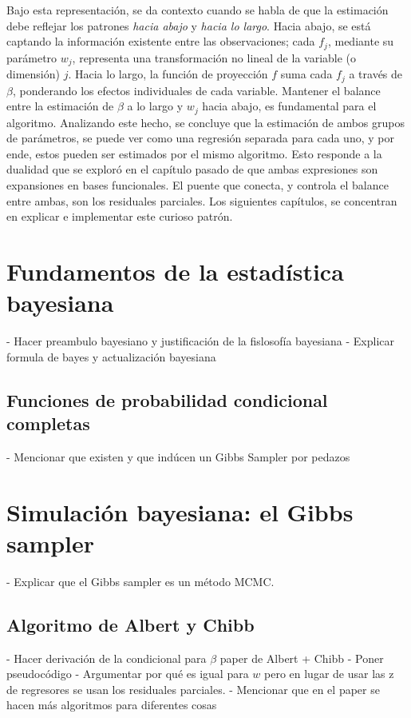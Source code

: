 \documentclass[../Main/Main.tex]{subfiles}
\begin{document}
Bajo esta representación, se da contexto cuando se habla de que la estimación debe reflejar los patrones \textit{hacia abajo} y \textit{hacia lo largo}. Hacia abajo, se está captando la información existente entre las observaciones;  cada $f_j$, mediante su parámetro $w_j$, representa una transformación no lineal de la variable (o dimensión) $j$. Hacia lo largo, la función de proyección $f$ suma cada $f_j$ a través de $\beta$, ponderando los efectos individuales de cada variable. Mantener el balance entre la estimación de $\beta$ a lo largo y $w_j$ hacia abajo, es fundamental para el algoritmo. Analizando este hecho, se concluye que la estimación de ambos grupos de parámetros, se puede ver como una regresión separada para cada uno, y por ende, estos pueden ser estimados por el mismo algoritmo. Esto responde a la dualidad que se exploró en el capítulo pasado de que ambas expresiones son expansiones en bases funcionales. El puente que conecta, y controla el balance entre ambas, son los residuales parciales. Los siguientes capítulos, se concentran en explicar e implementar este curioso patrón. 

\section{Fundamentos de la estadística bayesiana}
- Hacer preambulo bayesiano y justificación de la fislosofía bayesiana
- Explicar formula de bayes y actualización bayesiana

\subsection{Funciones de probabilidad condicional completas}
- Mencionar que existen y que indúcen un Gibbs Sampler por pedazos

\section{Simulación bayesiana: el Gibbs sampler}
- Explicar que el Gibbs sampler es un método MCMC.

\subsection{Algoritmo de Albert y Chibb}
- Hacer derivación de la condicional para $\beta$ paper de Albert + Chibb
- Poner pseudocódigo
- Argumentar por qué es igual para $w$ pero en lugar de usar las z de regresores se usan los residuales parciales.
- Mencionar que en el paper se hacen más algoritmos para diferentes cosas
\end{document}
